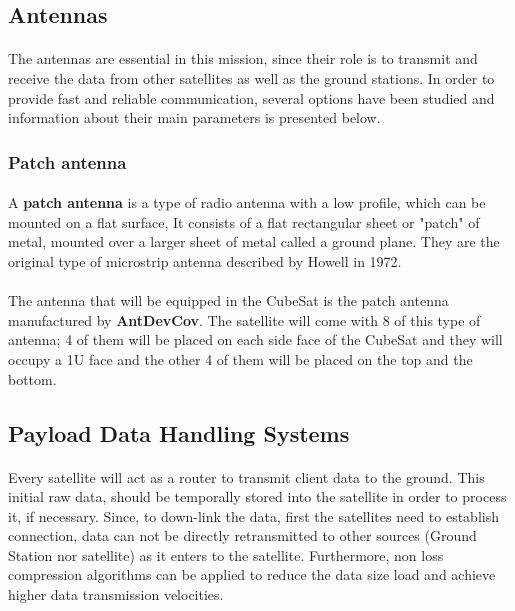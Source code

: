 \subsection{Antennas}
\paragraph{}The antennas are essential in this mission, since their role is to transmit and receive the data from other satellites as well as the ground stations. In order to provide fast and reliable communication, several options have been studied and information about their main parameters is presented below.

\subsubsection{Patch antenna}
\paragraph{}A \textbf{patch antenna} is a type of radio antenna with a low profile, which can be mounted on a flat surface, It consists of a flat rectangular sheet or "patch" of metal, mounted over a larger sheet of metal called a ground plane. They are the original type of microstrip antenna described by Howell in 1972. \cite[wikipedia]{patch}

\paragraph{}The antenna that will be equipped in the CubeSat is the patch antenna manufactured by \textbf{AntDevCov}. The satellite will come with 8 of this type of antenna; 4 of them will be placed on each side face of the CubeSat and they will occupy a 1U face and the other 4 of them will be placed on the top and the bottom.

\subsection{Payload Data Handling Systems}
\paragraph{} Every satellite will act as a router to transmit client data to the ground. This initial raw data, should be temporally stored into the satellite in order to process it, if necessary. Since, to down-link the data, first the satellites need to establish connection, data can not be directly retransmitted to other sources (Ground Station nor satellite) as it enters to the satellite. Furthermore, non loss compression algorithms can be applied to reduce the data size load and achieve higher data transmission velocities.

